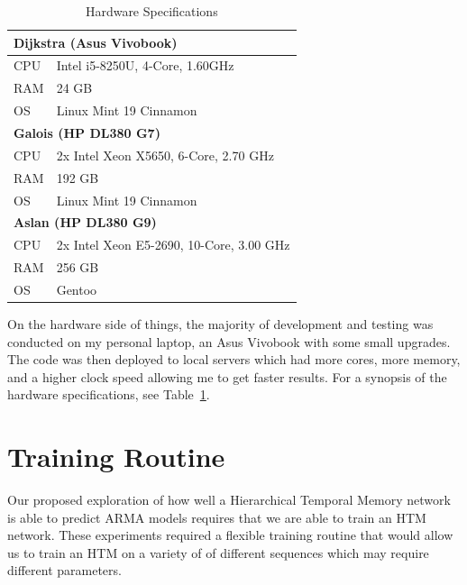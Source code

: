\documentclass[oneside,12pt,openany]{book}
\begin{document}
	\begin{table}[hbt!]
		\centering
		\begin{tabular}{|l|l|}
			\hline
			\multicolumn{2}{|l|}{\textbf{Dijkstra (Asus Vivobook)}} \\ \hline
			CPU     & Intel i5-8250U, 4-Core, 1.60GHz     \\ \hline
			RAM     & 24 GB                                \\ \hline
			OS      & Linux Mint 19 Cinnamon               \\ \hline
			\multicolumn{2}{|l|}{\textbf{Galois (HP DL380 G7)}}     \\ \hline
			CPU     &  2x Intel Xeon X5650, 6-Core, 2.70 GHz       \\ \hline
			RAM     & 192 GB                               \\ \hline
			OS      & Linux Mint 19 Cinnamon               \\ \hline
			\multicolumn{2}{|l|}{\textbf{Aslan (HP DL380 G9)}}                         \\ \hline
			CPU&    2x  Intel Xeon E5-2690, 10-Core, 3.00 GHz    \\ \hline
			RAM&    256 GB                                  \\ \hline
			OS&    Gentoo                               \\ \hline
		\end{tabular}
		\caption{Hardware Specifications}
		\label{tab:hardware}
	\end{table}

	On the hardware side of things, the majority of development and testing was conducted on my personal laptop, an Asus Vivobook with some small upgrades. The code was then deployed to local servers which had more cores, more memory, and a higher clock speed allowing me to get faster results. For a synopsis of the hardware specifications, see Table~\ref{tab:hardware}. 
	
	\section{Training Routine}\label{sec:exp:train}
	
	Our proposed exploration of how well a Hierarchical Temporal Memory network is able to predict ARMA models requires that we are able to train an HTM network. These experiments required a flexible training routine that would allow us to train an HTM on a variety of of different sequences which may require different parameters. 
	
\end{document}
